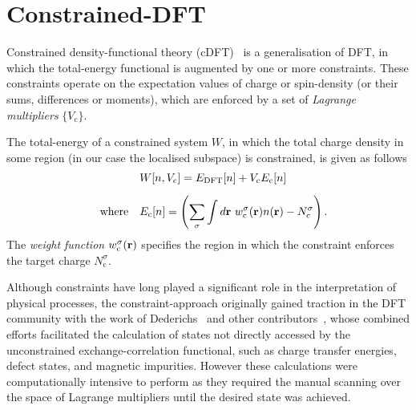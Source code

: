 \section{Constrained-DFT}
\label{sec:cdft}

Constrained density-functional theory (cDFT)~\cite{doi10.1021/cr200148b}
is a generalisation of DFT, 
in which the total-energy functional is augmented by 
one or more {constraints}.
%
{
These constraints operate on 
the expectation values of 
charge or spin-density  
(or their sums, differences or moments), 
which are enforced by a set of 
{\it Lagrange multipliers} $\{V_\textrm{c}\}$.}

The total-energy of a constrained system $W$, 
in which the total charge density in some region
(in our case the localised subspace) is constrained, 
is given as follows
%
\begin{align}
&W[n,V_\textrm{c}]=E_\textrm{DFT}[n]
+V_\textrm{c}E_\textrm{c}[n] \nonumber \\[0.5em]
\quad\mbox{where}\quad 
&E_\textrm{c}[n]=\left(\sum_\sigma \int d\br\ w_\textrm{c}^\sigma(\br)n(\br) - N^\sigma_\textrm{c}\right).
\end{align}
%
The {\it weight function}  $w_\textrm{c}^\sigma({\bf r})$
specifies the region in which the constraint 
enforces the target charge $N^\sigma_\textrm{c}$.

Although constraints have long played 
a significant role in the interpretation of physical processes, 
the constraint-approach originally gained traction 
in the DFT community with the work of 
Dederichs~\cite{PhysRevLett.53.2512} 
and other contributors~\cite{PhysRevB.44.13319,
PhysRevLett.56.2407,
doi:10.1021/j100132a040,
JCC:JCC12,
PhysRevLett.94.036104,
PhysRevB.75.115409,
Behler:947885}, 
whose combined efforts facilitated 
the calculation of states not directly accessed 
by the unconstrained exchange-correlation functional, 
such as charge transfer energies, 
defect states, 
and magnetic impurities.
%
However these calculations were computationally 
intensive to perform as they required 
the manual scanning over the space of Lagrange multipliers 
until the desired state was achieved.

